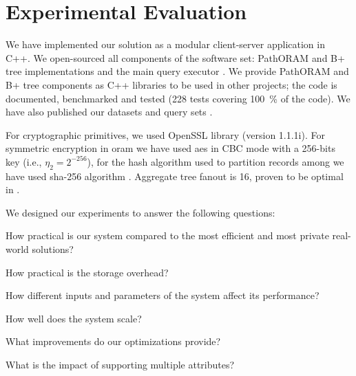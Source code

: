 \section{Experimental Evaluation}\label{section:range-persistent:experiments}

	We have implemented our solution as a modular client-server application in C++.
	We open-sourced all components of the software set: PathORAM \cite{github-path-oram} and B+ tree \cite{github-b-plus-tree} implementations and the main query executor \cite{github-epsolute}.
	We provide PathORAM and B+ tree components as C++ libraries to be used in other projects; the code is documented, benchmarked and tested (228 tests covering \SI{100}{\percent} of the code).
	We have also published our datasets and query sets \cite{our-datasets}.

	For cryptographic primitives, we used OpenSSL library (version 1.1.1i).
	For symmetric encryption in \acrshort{oram} we have used \acrshort{aes} in CBC mode \cite{nist-aes,nist-modes} with a 256-bits key (i.e., $\eta_2 = 2^{-256}$), for the hash algorithm  used to partition records among  we have used \acrshort{sha}-256 algorithm \cite{nist-hash}.
	Aggregate tree fanout \fanout{} is 16, proven to be optimal in \cite{hierarchical-methods-for-dp}.

	We designed our experiments to answer the following questions:
	\newlength{\questionLength}
	\settowidth{\questionLength}{Question-5}
	\begin{description}[
		font=\bfseries,
		leftmargin=\dimexpr\questionLength+1.0em\relax,
		labelindent=0pt,
		labelwidth=\questionLength%
	]
		\item[Question-1\label{item:question-practicality}] How practical is our system compared to the most efficient and most private real-world solutions?
		\item[Question-2\label{item:question-storage}] How practical is the storage overhead?
		\item[Question-3\label{item:question-parameters}] How different inputs and parameters of the system affect its performance?
		\item[Question-4\label{item:question-scalability}] How well does the system scale?
		\item[Question-5\label{item:question-optimizations}] What improvements do our optimizations provide?
		\item[Question-6\label{item:question-attributes}] What is the impact of supporting multiple attributes?
	\end{description}


